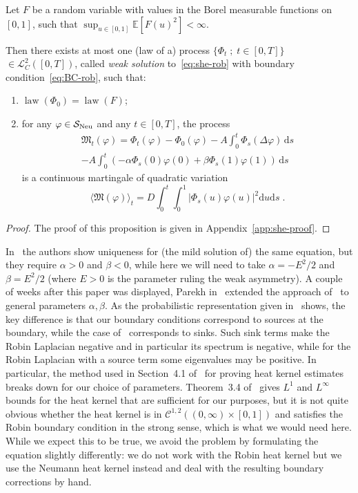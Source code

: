\documentclass[AHL,Unicode,longabstracts]{cedram}
\DeclareMathOperator{\Neu}{Neu}
\DeclareMathOperator{\law}{law}
\newcommand{\bb}[1]{{\mathbb #1}}
\newcommand{\mc}[1]{{\mathcal #1}}
\renewcommand{\mc}[1]{{\mathcal #1}}
\newcommand{\SN}{\ensuremath{\mc S_{\Neu}}}
\newcommand*{\dd}{\mathrm{d}}
\newcommand*{\ds}{\dd s}
\newcommand*{\du}{\dd u}
\begin{document}
\begin{prop}\label{def:she-rob}
Let $F$ be a random variable with values in the Borel measurable functions on $[0,1]$, such that $\sup_{u \in [0,1]} \bb E[F(u)^2] < \infty$.

Then there exists at most one (law of a) process $\{\Phi_t\; ; \; t \in [0,T]\}$ $\in \mc L^2_C([0,T])$, called \emph{weak solution} to~\eqref{eq:she-rob} with boundary condition~\eqref{eq:BC-rob}, such that:
\begin{enumerate}
\item \label{3.10.1} $\law(\Phi_0) = \law(F)$;
\item \label{3.10.2} for any $\varphi \in \mc \SN$ and any $t\in[0,T]$, the process
\begin{multline}\label{eq:she-rob-weak}
\mathfrak M_t (\varphi) = \Phi_t(\varphi)- \Phi_0(\varphi) - A \int_0^t \Phi_s(\Delta \varphi)\,\ds\\ - A \int_0^t (- \alpha \Phi_s(0) \varphi(0)+ \beta \Phi_s(1) \varphi(1))\, \ds
\end{multline}
is a continuous martingale of quadratic variation
\[
\big\langle \mathfrak M (\varphi) \big\rangle_t = D \int_0^t \int_0^1 |\Phi_s(u) \varphi(u)|^2 \du \ds\;.
\]
\end{enumerate}
\end{prop}

\begin{proof}
The proof of this proposition is given in Appendix~\ref{app:she-proof}.
\end{proof}

\begin{rema}\label{rmk:CS}
In~\cite[Proposition~2.7]{Corwin2016} the authors show uniqueness for (the mild solution of) the same equation, but they require $\alpha >0$ and $\beta < 0$, while here we will need to take $\alpha = - E^2/2$ and $\beta = E^2/2$ (where $E>0$ is the parameter ruling the weak asymmetry). A couple of weeks after this paper was displayed, Parekh in~\cite{Parekh2017} extended the approach of~\cite{Corwin2016} to general parameters $\alpha,\beta$. As the probabilistic representation given in~\cite{Freidlin1985, Papanicolaou1990} shows, the key difference is that our boundary conditions correspond to sources at the boundary, while the case of~\cite{Corwin2016} corresponds to sinks. Such sink terms make the Robin Laplacian negative and in particular its spectrum is negative, while for the Robin Laplacian with a source term some eigenvalues may be positive. In particular, the method used in Section~4.1 of~\cite{Corwin2016} for proving heat kernel estimates breaks down for our choice of parameters. Theorem~3.4 of~\cite{Papanicolaou1990} gives $L^1$ and $L^\infty$ bounds for the heat kernel that are sufficient for our purposes, but it is not quite obvious whether the heat kernel is in $\mc C^{1,2}((0,\infty) \times [0,1])$ and satisfies the Robin boundary condition in the strong sense, which is what we would need here. While we expect this to be true, we avoid the problem by formulating the equation slightly differently: we do not work with the Robin heat kernel but we use the Neumann heat kernel instead and deal with the resulting boundary corrections by hand.
\end{rema}
\end{document}
